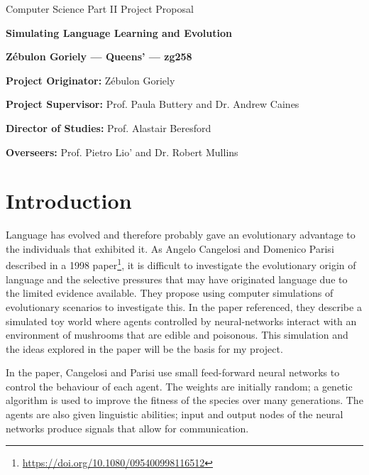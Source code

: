 \documentclass[12pt]{article}
\newcommand{\belgianspacing}{\frenchspacing}
\begin{document}
\belgianspacing

\thispagestyle{empty}



\centerline{\large Computer Science Part II Project Proposal}
\vspace{0.2in}
\centerline{\Large\bf Simulating Language Learning and Evolution}
\vspace{0.2in}
\centerline{\large {\bf{Z\'ebulon Goriely --- Queens' --- zg258}}}
\vspace{0.2in}
\centerline{\large {}}
 
 \vspace{0.3in}
 

{\bf Project Originator:} Z\'ebulon Goriely

{\bf Project Supervisor:} {Prof. Paula Buttery and Dr. Andrew Caines}

{\bf Director of Studies:}  {Prof. Alastair Beresford}

{\bf Overseers:} {Prof. Pietro Lio’} and {Dr. Robert Mullins}

\section*{Introduction}

Language has evolved and therefore probably gave an evolutionary advantage to the individuals that exhibited it. As Angelo Cangelosi and Domenico Parisi described in a 1998 paper\footnote{\url{https://doi.org/10.1080/095400998116512}}, it is difficult to investigate the evolutionary origin of language and the selective pressures that may have originated language due to the limited evidence available. They propose using computer simulations of evolutionary scenarios to investigate this. In the paper referenced, they describe a simulated toy world where agents controlled by neural-networks interact with an environment of mushrooms that are edible and poisonous. This simulation and the ideas explored in the paper will be the basis for my project.

In the paper, Cangelosi and Parisi use small feed-forward neural networks to control the behaviour of each agent. The weights are initially random; a genetic algorithm is used to improve the fitness of the species over many generations. The agents are also given linguistic abilities; input and output nodes of the neural networks produce signals that allow for communication.
\end{document}

